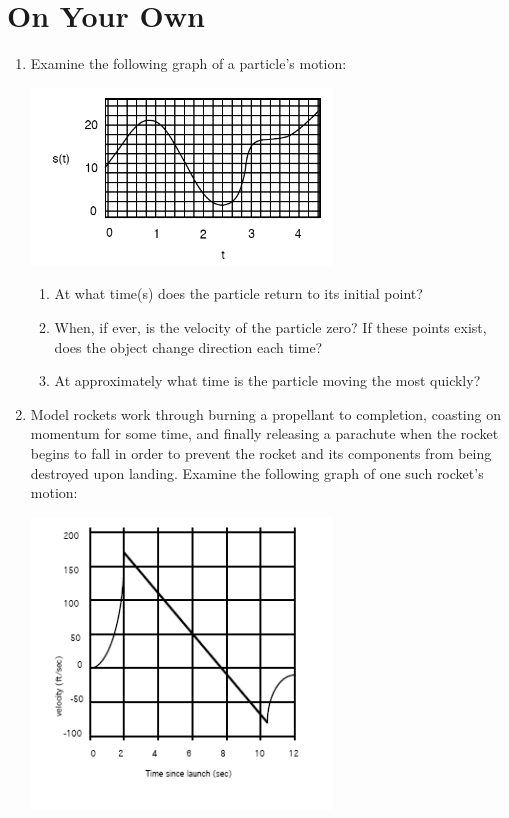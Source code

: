 \documentclass{ximera}
\begin{document}
\section{On Your Own}
\begin{enumerate}
\item{Examine the following graph of a particle's motion:}
\begin{image}
    \includegraphics[width=80mm]{position.png}
\end{image}
\begin{enumerate}
\item{At what time(s) does the particle return to its initial point?}
\item{When, if ever, is the velocity of the particle zero? If these points exist, does the object change direction each time?}
\item{At approximately what time is the particle moving the most quickly?}
\end{enumerate}
\item{Model rockets work through burning a propellant to completion, coasting on momentum for some time, and finally releasing a parachute when the rocket begins to fall in order to prevent the rocket and its components from being destroyed upon landing. Examine the following graph of one such rocket's motion:}
\begin{image}
    \includegraphics[width=80mm]{rocket.png}

\end{image}
\end{enumerate}
\end{document}
